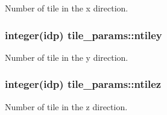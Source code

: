 Number of tile in the x direction. 

\subsubsection[{\texorpdfstring{ntiley}{ntiley}}]{\setlength{\rightskip}{0pt plus 5cm}integer(idp) tile\+\_\+params\+::ntiley}\hypertarget{namespacetile__params_a820079c73bdf0bd85aa8d2cf6b1a2b40}{}\label{namespacetile__params_a820079c73bdf0bd85aa8d2cf6b1a2b40}


Number of tile in the y direction. 

\subsubsection[{\texorpdfstring{ntilez}{ntilez}}]{\setlength{\rightskip}{0pt plus 5cm}integer(idp) tile\+\_\+params\+::ntilez}\hypertarget{namespacetile__params_ac5c03752e70281443173d320d476f1e9}{}\label{namespacetile__params_ac5c03752e70281443173d320d476f1e9}


Number of tile in the z direction. 

